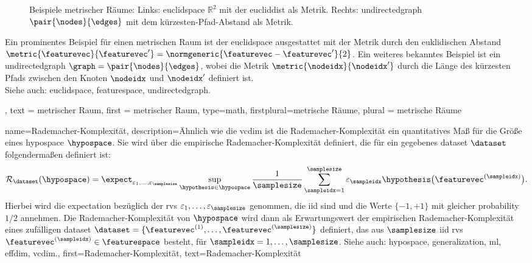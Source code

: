 {{{{{{\begin{figure}[H]
		\caption{Beispiele metrischer Räume: Links: \gls{euclidspace} $\mathbb{R}^2$ mit der \gls{eucliddist} als Metrik. Rechts: \gls{undirectedgraph} $\pair{\nodes}{\edges}$ mit dem kürzesten-Pfad-Abstand als Metrik.\label{fig:metric_space_examples_dict}}
	     \end{figure}
		Ein prominentes Beispiel für einen metrischen Raum ist der \gls{euclidspace} ausgestattet mit der Metrik durch den euklidischen Abstand 
		$\metric{\featurevec}{\featurevec'} = \normgeneric{\featurevec - \featurevec'}{2}$. 
		Ein weiteres bekanntes Beispiel ist ein \gls{undirectedgraph}  
        $\graph=\pair{\nodes}{\edges}$, wobei die Metrik $\metric{\nodeidx}{\nodeidx'}$ durch die Länge des kürzesten Pfads zwischen den Knoten $\nodeidx$ und $\nodeidx'$ definiert ist.
			\\
		Siehe auch: \gls{euclidspace}, \gls{featurespace}, \gls{undirectedgraph}. },
    text = {metrischer Raum}, 
	first = {metrischer Raum}, 
	type=math, 
	firstplural={metrische Räume}, 
	plural = {metrische Räume}
}

{name={Rademacher-Komplexität},
 	description={Ähnlich wie die \gls{vcdim} ist die  Rademacher-Komplexität \cite{bartlett2002rademacher} ein quantitatives Maß für die Größe eines \gls{hypospace} $\hypospace$. Sie wird über die empirische Rademacher-Komplexität definiert, die für ein gegebenes \gls{dataset} $\dataset$ folgendermaßen definiert ist:
	\begin{equation}
    \mathcal{R}_\dataset(\hypospace) 
    = 
    \expect_{\varepsilon_{1},\ldots,\varepsilon_{\samplesize} } 
	\sup_{\hypothesis \in \hypospace} \frac{1}{\samplesize} \sum_{\sampleidx=1}^\samplesize \varepsilon_\sampleidx 
	\hypothesis\big(\featurevec^{(\sampleidx)} \big).
    \label{eq:def_emprical_rademacher_complexity_hypothesis_dict}
    \end{equation}
	Hierbei wird die \gls{expectation} bezüglich der \glspl{rv} $\varepsilon_{1},\ldots,\varepsilon_{\samplesize}$ genommen, die \gls{iid} sind und die Werte $\{ -1, +1 \}$ mit gleicher \gls{probability} $1/2$ annehmen. Die Rademacher-Komplexität von $\hypospace$ wird dann als Erwartungswert der empirischen Rademacher-Komplexität eines zufälligen \gls{dataset} $\dataset = \{\featurevec^{(1)}, \hdots, \featurevec^{(\samplesize)}\}$ definiert, das aus $\samplesize$ \gls{iid} \glspl{rv} $\featurevec^{(\sampleidx)} \in \featurespace$ besteht, für $\sampleidx=1,\ldots,\samplesize$.  
        Siehe auch: \gls{hypospace},  \gls{generalization}, \gls{ml}, \gls{effdim}, \gls{vcdim}.},
	first={Rademacher-Komplexität},
	text={Rademacher-Komplexität}  
}

}}}}
